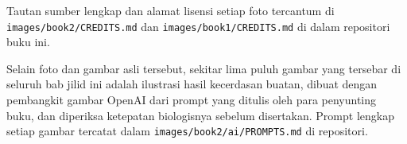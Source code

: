 Tautan sumber lengkap dan alamat lisensi setiap foto tercantum di
\texttt{images/\allowbreak book2/\allowbreak CREDITS.md} dan \texttt{images/\allowbreak book1/\allowbreak CREDITS.md}
di dalam repositori buku ini.

\bigskip
Selain foto dan gambar asli tersebut, sekitar lima puluh gambar yang
tersebar di seluruh bab jilid ini adalah ilustrasi hasil kecerdasan
buatan, dibuat dengan pembangkit gambar OpenAI dari prompt yang ditulis
oleh para penyunting buku, dan diperiksa ketepatan biologisnya sebelum
disertakan. Prompt lengkap setiap gambar tercatat dalam
\texttt{images/\allowbreak book2/\allowbreak ai/\allowbreak PROMPTS.md} di repositori.
\par\endgroup
\clearpage
